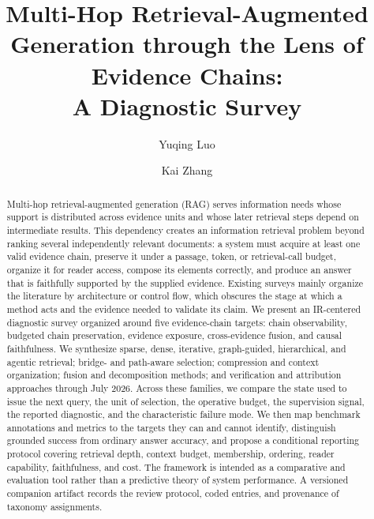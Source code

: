 \documentclass[manuscript,review]{acmart}
\newcommand{\ReviewCutoff}{July 2026}
\theoremstyle{definition}
\theoremstyle{plain}
\theoremstyle{remark}
\begin{document}
\title[Multi-Hop RAG through Evidence Chains]
{Multi-Hop Retrieval-Augmented Generation through the Lens of Evidence Chains:\\
A Diagnostic Survey}

\author{Yuqing Luo}
\author{Kai Zhang}

\begin{abstract}
Multi-hop retrieval-augmented generation (RAG) serves information needs whose
support is distributed across evidence units and whose later retrieval steps
depend on intermediate results. This dependency creates an information retrieval
problem beyond ranking several independently relevant documents: a
system must acquire at least one valid evidence chain, preserve it under a
passage, token, or retrieval-call budget, organize it for reader access,
compose its elements correctly, and produce an answer that is faithfully
supported by the supplied evidence. Existing surveys mainly organize the
literature by architecture or control flow, which obscures the stage at which
a method acts and the evidence needed to validate its claim. We present an
IR-centered diagnostic survey organized around five evidence-chain targets:
chain observability, budgeted chain preservation, evidence exposure,
cross-evidence fusion, and causal faithfulness. We synthesize sparse, dense,
iterative, graph-guided, hierarchical, and agentic retrieval; bridge- and
path-aware selection; compression and context organization; fusion and
decomposition methods; and verification and attribution approaches through
\ReviewCutoff. Across these families, we compare the state used to issue the
next query, the unit of selection, the operative budget, the supervision
signal, the reported diagnostic, and the characteristic failure mode. We
then map benchmark annotations and metrics to the targets they can and cannot
identify, distinguish grounded success from ordinary answer accuracy, and
propose a conditional reporting protocol covering retrieval depth, context
budget, membership, ordering, reader capability, faithfulness, and cost. The
framework is intended as a comparative and evaluation tool rather than a
predictive theory of system performance. A versioned companion artifact
records the review protocol, coded entries, and provenance of taxonomy
assignments.
\end{abstract}
\end{document}
